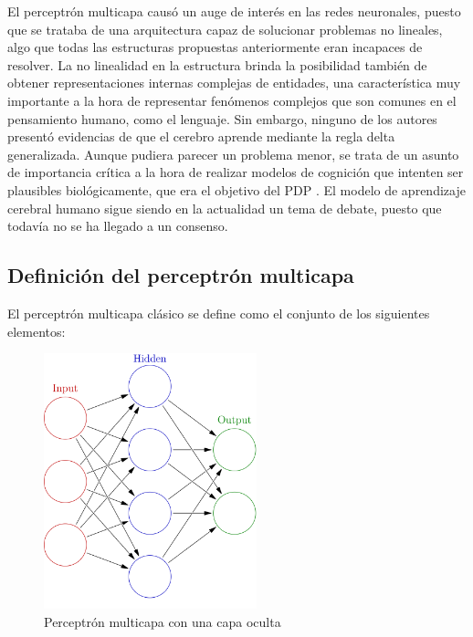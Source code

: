 \documentclass[11pt,twoside,titlepage,a4paper]{article}
\numberwithin{equation}{section} %
\theoremstyle{usual}
\begin{document}
El perceptrón multicapa causó un auge de interés en las redes neuronales,
puesto que se trataba de una arquitectura capaz de solucionar problemas
no lineales, algo que todas las estructuras propuestas anteriormente
eran incapaces de resolver. La no linealidad en la estructura brinda la posibilidad
también de obtener representaciones internas complejas de entidades, una
característica muy importante a la hora de representar fenómenos complejos que
son comunes en el pensamiento humano, como el lenguaje. Sin embargo,
ninguno de los autores presentó evidencias de que el cerebro aprende mediante la
regla delta generalizada. Aunque pudiera parecer un problema menor, se trata de un 
asunto de importancia crítica a la hora de realizar modelos de cognición que
intenten ser plausibles biológicamente, que era el objetivo del PDP \cite{multilayer}. El modelo de aprendizaje cerebral humano sigue siendo en la actualidad un tema de debate, puesto que todavía no se ha llegado a un consenso.

\subsection{Definición del perceptrón multicapa}

El perceptrón multicapa clásico se define como el conjunto de los siguientes
elementos:\\

\begin{figure}[!h]
    \centering
    \includegraphics[height=20em]{Source/images/multicapa.png}
    \caption{Perceptrón multicapa con una capa oculta}
    \label{fig:multicapa}
\end{figure}
\end{document}
